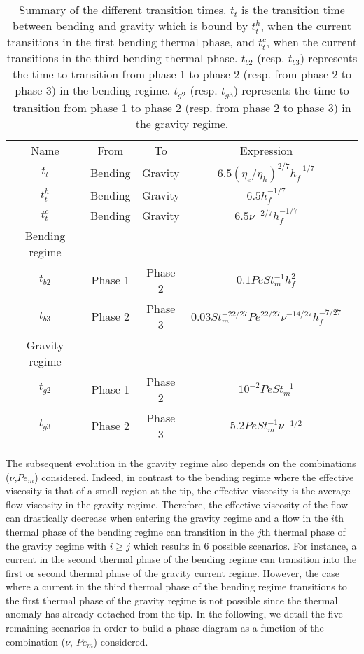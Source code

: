 \begin{table}
  \begin{center}
    \begin{tabular}{ccccc}
      Name&From&To&Expression\\
      $t_t$&Bending&Gravity&$6.5(\eta_e/\eta_h)^{2/7}h_f^{-1/7}$\\
      $t_t^h$&Bending&Gravity&$6.5h_f^{-1/7}$\\
      $t_t^c$&Bending&Gravity&$6.5\nu^{-2/7}h_f^{-1/7}$\\
      Bending regime&\multicolumn{3}{c}{} \\
      $t_{b2}$&Phase 1& Phase 2&$0.1Pe St_m^{-1} h_f^2$\\
      $t_{b3}$&Phase 2& Phase 3 &$0.03 St_m^{-22/27}Pe^{22/27}\nu^{-14/27}h_f^{-7/27}$\\
      Gravity regime&\multicolumn{3}{c}{} \\
      $t_{g2}$ &Phase 1& Phase 2 &$10^{-2}PeSt_m^{-1}$\\
      $t_{g3}$ &Phase 2& Phase 3 &$ 5.2Pe St_m^{-1}\nu^{-1/2}$\\
    \end{tabular}
    \caption{Summary of the different  transition times.  $t_t$ is the
      transition time  between bending and  gravity which is  bound by
      $t_t^h$,  when  the current  transitions  in  the first  bending
      thermal phase, and $t_t^c$, when  the current transitions in the
      third  bending   thermal  phase.   $t_{b2}$   (resp.   $t_{b3}$)
      represents  the time  to  transition  from phase  1  to phase  2
      (resp. from phase 2 to phase  3) in the bending regime. $t_{g2}$
      (resp. $t_{g3}$) represents the time  to transition from phase 1
      to  phase 2  (resp. from  phase  2 to  phase 3)  in the  gravity
      regime. }
    \label{C3-tab:TimeTransition}
  \end{center}
\end{table}
The subsequent  evolution in  the gravity regime  also depends  on the
combinations ($\nu$,$Pe_m$)  considered.  Indeed,  in contrast  to the
bending regime where the effective viscosity is that of a small region
at the tip,  the effective viscosity is the average  flow viscosity in
the gravity  regime.  Therefore, the  effective viscosity of  the flow
can drastically decrease  when entering the gravity regime  and a flow
in the $i$th thermal phase of the bending regime can transition in the
$j$th thermal phase of the gravity  regime with $i\ge j$ which results
in  $6$ possible  scenarios.  For  instance, a  current in  the second
thermal phase of  the bending regime can transition into  the first or
second thermal phase of the  gravity current regime. However, the case
where  a current  in the  third thermal  phase of  the bending  regime
transitions to  the first thermal phase  of the gravity regime  is not
possible since the thermal anomaly  has already detached from the tip.
In the following,  we detail the five remaining scenarios  in order to
build a phase diagram as a function of the combination ($\nu$, $Pe_m$)
considered.



